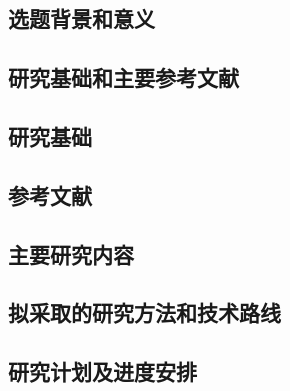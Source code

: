 \documentclass[openReport]{XaufeThesisTemplate}
\begin{document}




\begin{sectionCell}
  \section{选题背景和意义}
\end{sectionCell}
\begin{sectionCell}
  \section{研究基础和主要参考文献}
    \subsection{研究基础}
    \subsection{参考文献}
      
      \nocite{*}
\end{sectionCell}
\begin{sectionCell}
  \section{主要研究内容}
\end{sectionCell}
\begin{sectionCell}
  \section{拟采取的研究方法和技术路线}
\end{sectionCell}
\begin{sectionCell}
  \section{研究计划及进度安排}
\end{sectionCell}

\end{document}

